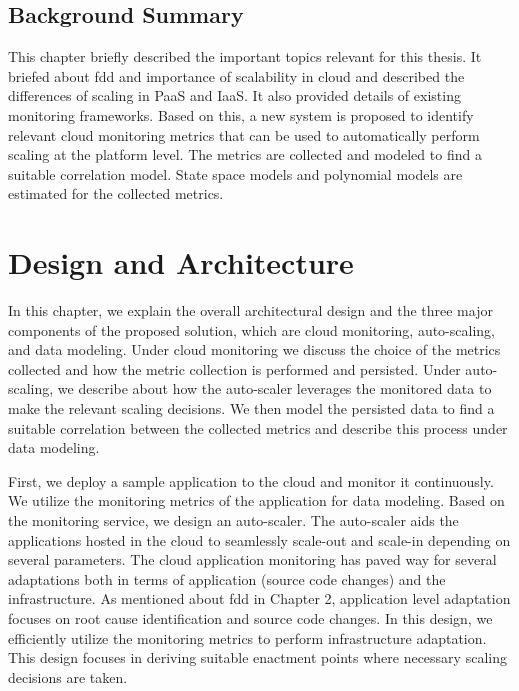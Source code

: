 \documentclass[article,type=msc,colorback,12pt,accentcolor=tud8b,table]{tudthesis}
\begin{document}
\subsection{Background Summary}
This chapter briefly described the important topics relevant for this thesis. It briefed about \gls{fdd} and importance of scalability in cloud and described the differences of scaling in PaaS and IaaS. It also provided details of existing monitoring frameworks. Based on this, a new system is proposed to identify relevant cloud monitoring metrics that can be used to automatically perform scaling at the platform level. The metrics are collected and modeled to find a suitable correlation model. State space models and polynomial models are estimated for the collected metrics.
	
 \cleardoublepage

 \hfill 
 \section{Design and Architecture}	
 \hfill \break
 
 In this chapter, we explain the overall architectural design and the three major components of the proposed solution, which are cloud monitoring, auto-scaling, and data modeling. Under cloud monitoring we discuss the choice of the metrics collected and how the metric collection is performed and persisted. Under auto-scaling, we describe about how the auto-scaler leverages the monitored data to make the relevant scaling decisions. We then model the persisted data to find a suitable correlation between the collected metrics and describe this process under data modeling. 
 
 	First, we deploy a sample application to the cloud and monitor it continuously. We utilize the monitoring metrics of the application for data modeling. Based on the monitoring service, we design an auto-scaler. The auto-scaler aids the applications hosted in the cloud to seamlessly scale-out and scale-in depending on several parameters. The cloud application monitoring has paved way for several adaptations both in terms of application (source code changes) and the infrastructure. As mentioned about \gls{fdd}  in Chapter 2, application level adaptation focuses on root cause identification and source code changes. In this design, we efficiently utilize  the monitoring metrics to perform infrastructure adaptation.  This design focuses in deriving suitable enactment points where necessary scaling decisions are taken. 
 
\end{document}
